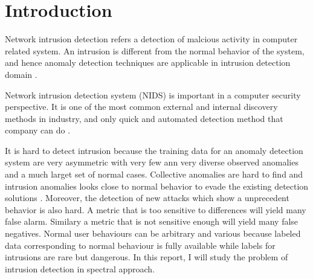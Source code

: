 \section{Introduction}
Network intrusion detection refers a detection of malcious activity in computer related system. 
An intrusion is different from the normal behavior of the system, and hence anomaly detection techniques are applicable in intrusion detection domain \cite{chandola09}.

Network intrusion detection system (NIDS) is important in a computer security perspective. 
It is one of the most common external and internal discovery methods in industry, and only quick and automated detection method that company can do \cite{verizon14}. 

It is hard to detect intrusion because the training data for an anomaly detection system are very asymmetric with very few ann very diverse observed anomalies and a much larget set of normal cases. 
Collective anomalies are hard to find and intrusion anomalies looks close to normal behavior to evade the existing detection solutions \cite{chandola09}. 
Moreover, the detection of new attacks which show a unprecedent behavior is also hard. 
A metric that is too sensitive to differences will yield many false alarm. Similary a metric that is not sensitive enough will yield many false negatives.
Normal user behaviours can be arbitrary and various because labeled data corresponding to normal behaviour is fully available while labels for intrusions are rare but dangerous. 
In this report, I will study the problem of intrusion detection in spectral approach. 
